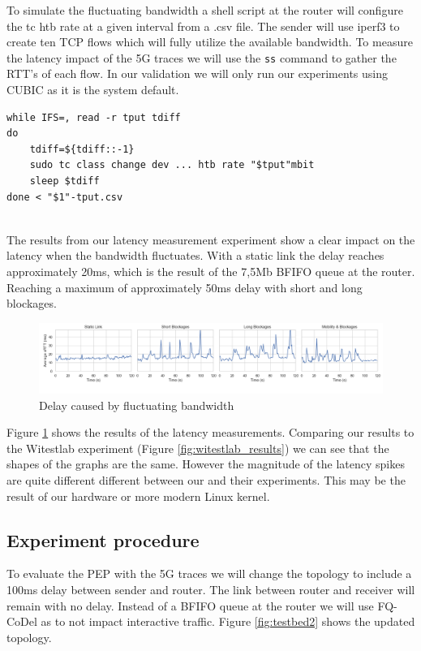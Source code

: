 \documentclass[a4paper,english, 11pt]{report}
\begin{document}
To simulate the fluctuating bandwidth a shell script at the router will configure the tc htb rate at a given interval from a .csv file. The sender will use iperf3 to create ten TCP flows which will fully utilize the available bandwidth. To measure the latency impact of the 5G traces we will use the \verb|ss| command to gather the RTT's of each flow. In our validation we will only run our experiments using CUBIC as it is the system default.

\begin{verbatim}
while IFS=, read -r tput tdiff
do 
    tdiff=${tdiff::-1}	
    sudo tc class change dev ... htb rate "$tput"mbit
    sleep $tdiff
done < "$1"-tput.csv
\end{verbatim}\\

The results from our latency measurement experiment show a clear impact on the latency when the bandwidth fluctuates. With a static link the delay reaches approximately 20ms, which is the result of the 7,5Mb BFIFO queue at the router. Reaching a maximum of approximately 50ms delay with short and long blockages.\\

\begin{figure}[h!] %
	\centering
	\includegraphics[scale=0.33]{../diagrams/witestlab/delay2.png}
  	\caption{Delay caused by fluctuating bandwidth}
  	\label{fig:witestlab_graph_delay}
\end{figure}

Figure \ref{fig:witestlab_graph_delay} shows the results of the latency measurements. Comparing our results to the Witestlab experiment (Figure \ref{fig:witestlab_results}) we can see that the shapes of the graphs are the same. However the magnitude of the latency spikes are quite different different between our and their experiments. This may be the result of our hardware or more modern Linux kernel. 

\subsection{Experiment procedure}
To evaluate the PEP with the 5G traces we will change the topology to include a 100ms delay between sender and router. The link between router and receiver will remain with no delay. Instead of a BFIFO queue at the router we will use FQ-CoDel as to not impact interactive traffic. Figure \ref{fig:testbed2} shows the updated topology.\\
\end{document}
